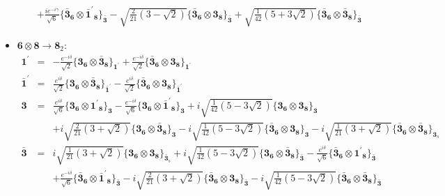\documentclass[english]{article}
\newcommand{\subcg}[3]{\big\{ {#1}\otimes{#2}\big\}^{}_{#3}}
\newcommand{\rep}[1]{\mathbf{#1}}
\begin{document}
\begin{itemize}
\begin{eqnarray*}
 & & +\frac{i e^{-i \gamma }}{\sqrt{6}}\subcg{\rep{\bar{3}}_{\rep{6}}}{\rep{\bar{1}^{\prime}}_{\rep{8}}}{\rep{\bar{3}}}-\sqrt{\frac{2}{21} \left(3-\sqrt{2}\right)}\subcg{\rep{\bar{3}}_{\rep{6}}}{\rep{3}_{\rep{8}}}{\rep{\bar{3}}}+\sqrt{\frac{1}{42} \left(5+3 \sqrt{2}\right)}\subcg{\rep{\bar{3}}_{\rep{6}}}{\rep{\bar{3}}_{\rep{8}}}{\rep{\bar{3}}}
\end{eqnarray*}
\item $\rep{6}\otimes\rep{8}\to\rep{8}_{2}$:
\begin{eqnarray*}
\rep{1^{\prime}} &=& -\frac{e^{-i \delta }}{\sqrt{2}}\subcg{\rep{3}_{\rep{6}}}{\rep{\bar{3}}_{\rep{8}}}{\rep{1^{\prime}}}+\frac{e^{-i \delta }}{\sqrt{2}}\subcg{\rep{\bar{3}}_{\rep{6}}}{\rep{3}_{\rep{8}}}{\rep{1^{\prime}}}
\\
\rep{\bar{1}^{\prime}} &=& \frac{e^{i \delta }}{\sqrt{2}}\subcg{\rep{3}_{\rep{6}}}{\rep{\bar{3}}_{\rep{8}}}{\rep{\bar{1}^{\prime}}}-\frac{e^{i \delta }}{\sqrt{2}}\subcg{\rep{\bar{3}}_{\rep{6}}}{\rep{3}_{\rep{8}}}{\rep{\bar{1}^{\prime}}}
\\
\rep{3} &=& \frac{e^{i \delta }}{\sqrt{6}}\subcg{\rep{3}_{\rep{6}}}{\rep{1^{\prime}}_{\rep{8}}}{\rep{3}}-\frac{e^{-i \delta }}{\sqrt{6}}\subcg{\rep{3}_{\rep{6}}}{\rep{\bar{1}^{\prime}}_{\rep{8}}}{\rep{3}}+i \sqrt{\frac{1}{42} \left(5-3 \sqrt{2}\right)}\subcg{\rep{3}_{\rep{6}}}{\rep{3}_{\rep{8}}}{\rep{3}} \\ 
 & & +i \sqrt{\frac{2}{21} \left(3+\sqrt{2}\right)}\subcg{\rep{3}_{\rep{6}}}{\rep{\bar{3}}_{\rep{8}}}{\rep{3}}-i \sqrt{\frac{1}{42} \left(5-3 \sqrt{2}\right)}\subcg{\rep{\bar{3}}_{\rep{6}}}{\rep{3}_{\rep{8}}}{\rep{3}}-i \sqrt{\frac{1}{21} \left(3+\sqrt{2}\right)}\subcg{\rep{\bar{3}}_{\rep{6}}}{\rep{\bar{3}}_{\rep{8}}}{\rep{3}_{s}}
\\
\rep{\bar{3}} &=& i \sqrt{\frac{1}{21} \left(3+\sqrt{2}\right)}\subcg{\rep{3}_{\rep{6}}}{\rep{3}_{\rep{8}}}{\rep{\bar{3}}_{s}}+i \sqrt{\frac{1}{42} \left(5-3 \sqrt{2}\right)}\subcg{\rep{3}_{\rep{6}}}{\rep{\bar{3}}_{\rep{8}}}{\rep{\bar{3}}}-\frac{e^{i \delta }}{\sqrt{6}}\subcg{\rep{\bar{3}}_{\rep{6}}}{\rep{1^{\prime}}_{\rep{8}}}{\rep{\bar{3}}} \\ 
 & & +\frac{e^{-i \delta }}{\sqrt{6}}\subcg{\rep{\bar{3}}_{\rep{6}}}{\rep{\bar{1}^{\prime}}_{\rep{8}}}{\rep{\bar{3}}}-i \sqrt{\frac{2}{21} \left(3+\sqrt{2}\right)}\subcg{\rep{\bar{3}}_{\rep{6}}}{\rep{3}_{\rep{8}}}{\rep{\bar{3}}}-i \sqrt{\frac{1}{42} \left(5-3 \sqrt{2}\right)}\subcg{\rep{\bar{3}}_{\rep{6}}}{\rep{\bar{3}}_{\rep{8}}}{\rep{\bar{3}}}
\end{eqnarray*}
\end{itemize}
\end{document}
